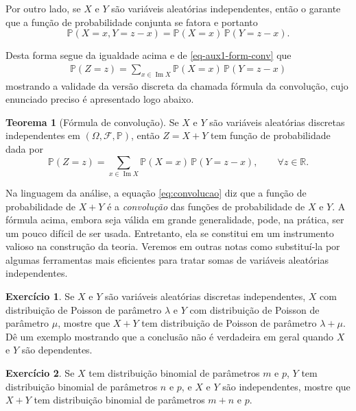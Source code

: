 \documentclass[12pt,portuguese]{article}
\theoremstyle{definition}
\newtheorem{theorem}{Teorema}
\newtheorem{exercise}{Exercício}
\begin{document}
Por outro lado, se $X$ e $Y$ são variáveis aleatórias independentes, 
então o  garante que a função de probabilidade conjunta
se fatora e portanto  
$$
\mathbb{P}(X = x, Y = z - x) = \mathbb{P}(X = x)\, \mathbb{P}(Y = z-x).
$$

Desta forma segue da igualdade acima e de \eqref{eq-aux1-form-conv}
que
\begin{align*}
\mathbb{P}(Z = z)
=
\sum_{x \in \operatorname{Im} X} \mathbb{P}(X = x)\, \mathbb{P}(Y = z-x)
\end{align*}
mostrando a validade da versão discreta da chamada fórmula da convolução,
cujo enunciado preciso é apresentado logo abaixo. 


\begin{theorem}[Fórmula de convolução]\label{thm:convolucao}
Se $X$ e $Y$ são variáveis aleatórias discretas independentes em
$(\Omega, \mathcal{F}, \mathbb{P})$, então $Z = X + Y$ tem função de
probabilidade dada por 
\begin{equation}\label{eq:convolucao}
\mathbb{P}(Z = z)
= \sum_{x \in \operatorname{Im} X} \mathbb{P}(X = x)\,
\mathbb{P}(Y = z - x), \qquad  \forall z \in \mathbb{R}.
\end{equation}
\end{theorem}

Na linguagem da análise, a equação \eqref{eq:convolucao} diz que a função
de probabilidade de $X + Y$ é a \emph{convolução} das funções de
probabilidade de $X$ e $Y$. A fórmula acima, embora seja
válida em grande generalidade, pode, na prática, ser um pouco
difícil de ser usada. Entretanto, ela se constitui em um instrumento valioso
na construção da teoria. Veremos em outras notas 
como substituí-la por algumas ferramentas
mais eficientes para tratar somas de variáveis aleatórias
independentes.

\begin{exercise}\label{exercise:soma-poisson}
Se $X$ e $Y$ são variáveis aleatórias discretas independentes, $X$ com
distribuição de Poisson de parâmetro $\lambda$ e $Y$ com distribuição de
Poisson de parâmetro $\mu$, mostre que $X + Y$ tem distribuição de Poisson
de parâmetro $\lambda + \mu$. Dê um exemplo mostrando que a conclusão não
é verdadeira em geral quando $X$ e $Y$ são dependentes.
\end{exercise}

\begin{exercise}\label{exercise:soma-binomial}
Se $X$ tem distribuição binomial de parâmetros $m$ e $p$, $Y$ tem
distribuição binomial de parâmetros $n$ e $p$, e $X$ e $Y$ são
independentes, mostre que $X + Y$ tem distribuição binomial de parâmetros
$m + n$ e $p$.
\end{exercise}
\end{document}
